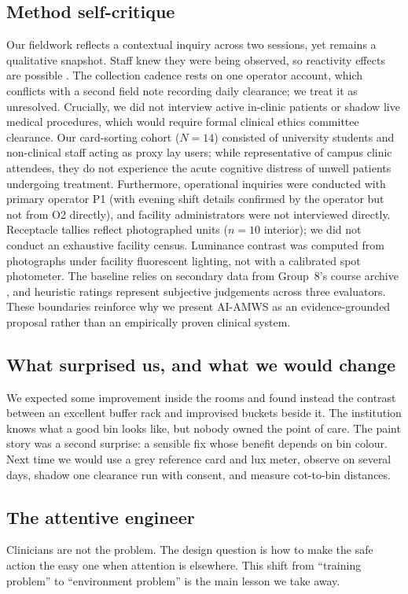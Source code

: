 \documentclass[10pt,twocolumn,a4paper]{article}
\begin{document}
\subsection{Method self-critique}
Our fieldwork reflects a contextual inquiry across two sessions, yet remains a qualitative snapshot. Staff knew they were being observed, so reactivity effects are possible \cite{mccambridge2014}. The collection cadence rests on one operator account, which conflicts with a second field note recording daily clearance; we treat it as unresolved. Crucially, we did not interview active in-clinic patients or shadow live medical procedures, which would require formal clinical ethics committee clearance. Our card-sorting cohort ($N=14$) consisted of university students and non-clinical staff acting as proxy lay users; while representative of campus clinic attendees, they do not experience the acute cognitive distress of unwell patients undergoing treatment. Furthermore, operational inquiries were conducted with primary operator P1 (with evening shift details confirmed by the operator but not from O2 directly), and facility administrators were not interviewed directly. Receptacle tallies reflect photographed units ($n=10$ interior); we did not conduct an exhaustive facility census. Luminance contrast was computed from photographs under facility fluorescent lighting, not with a calibrated spot photometer. The baseline relies on secondary data from Group~8's course archive \cite{g8report}, and heuristic ratings represent subjective judgements across three evaluators. These boundaries reinforce why we present AI-AMWS as an evidence-grounded proposal rather than an empirically proven clinical system.

\subsection{What surprised us, and what we would change}
We expected some improvement inside the rooms and found instead the contrast between an excellent buffer rack and improvised buckets beside it. The institution knows what a good bin looks like, but nobody owned the point of care. The paint story was a second surprise: a sensible fix whose benefit depends on bin colour. Next time we would use a grey reference card and lux meter, observe on several days, shadow one clearance run with consent, and measure cot-to-bin distances.

\subsection{The attentive engineer}
Clinicians are not the problem. The design question is how to make the safe action the easy one when attention is elsewhere. This shift from ``training problem'' to ``environment problem'' is the main lesson we take away.
\end{document}
